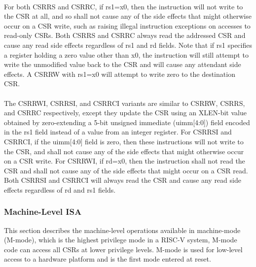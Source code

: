 \documentclass[../main.tex]{subfiles}
\begin{document}
\\For both CSRRS and CSRRC, if rs1=x0, then the instruction will not write to the CSR at all, and so shall not cause any of the side effects that might otherwise occur on a CSR write, such as raising
illegal instruction exceptions on accesses to read-only CSRs. Both CSRRS and CSRRC always read the addressed CSR and cause any read side effects regardless of rs1 and rd fields. Note that if rs1
specifies a register holding a zero value other than x0, the instruction will still attempt to write the unmodified value back to the CSR and will cause any attendant side effects. A CSRRW with
rs1=x0 will attempt to write zero to the destination CSR.\\
\\The CSRRWI, CSRRSI, and CSRRCI variants are similar to CSRRW, CSRRS, and CSRRC respectively, except they update the CSR using an XLEN-bit value obtained by zero-extending a 5-bit unsigned immediate (uimm[4:0]) field encoded in the rs1 field instead of a value from an integer register. For CSRRSI and CSRRCI, if the uimm[4:0] field is zero, then these instructions will not write to the CSR, and shall not cause any of the side effects that might otherwise occur on a CSR write. For CSRRWI, if rd=x0, then the instruction shall not read the CSR and shall not cause any of the side effects that might occur on a CSR read. Both CSRRSI and CSRRCI will always read the CSR and cause any read side effects regardless of rd and rs1 fields.

\subsubsection*{Machine-Level ISA}
This section describes the machine-level operations available in machine-mode (M-mode), which is the highest privilege mode in a RISC-V system, M-mode code can access all CSRs
at lower privilege levels. M-mode is used for low-level access to a hardware platform and is the first mode entered at reset.\\
\end{document}
